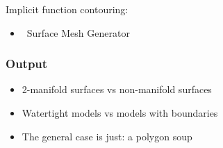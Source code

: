 Implicit function contouring:

\begin{itemize}
\item \cgal\ Surface Mesh Generator~\cite{cgal:ry-gsddrm-06,cgal:bo-pgsms-05}
\end{itemize}


\subsubsection{Output}

\begin{itemize}
\item 2-manifold surfaces vs non-manifold surfaces
\item Watertight models vs models with boundaries
\item The general case is just: a polygon soup
\end{itemize}


